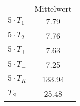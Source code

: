 \begin{minipage}{0.49\textwidth}
 \centering
 \begin{tabular}{l S}
 \toprule
$\text{}$ & $\text{Mittelwert}$ \\
 \midrule
 ${5} \cdot T_{1}$ &  7.79  \\
  ${5} \cdot T_{2}$ & 7.76  \\
${5} \cdot T_{+}$  &  7.63  \\
${5} \cdot T_{-}$  & 7.25  \\
${5} \cdot T_{K}$  & 133.94  \\
$T_{S}$ & 25.48 \\
 \bottomrule
 \end{tabular}
 \label{tab:mids_T_60}
  \end{minipage}
